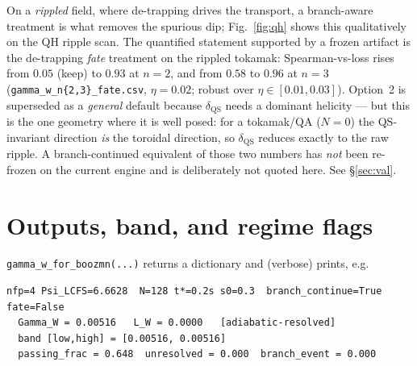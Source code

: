 \documentclass[11pt]{article}
\newcommand{\code}[1]{\texttt{#1}}
\begin{document}
On a \emph{rippled} field, where de-trapping drives the transport, a branch-aware treatment is what
removes the spurious dip; Fig.~\ref{fig:qh} shows this qualitatively on the QH ripple scan. The
quantified statement supported by a frozen artifact is the de-trapping \emph{fate} treatment on the
rippled tokamak: Spearman-vs-loss rises from $0.05$ (keep) to $\mathbf{0.93}$ at $n{=}2$, and from
$0.58$ to $\mathbf{0.96}$ at $n{=}3$ (\code{gamma\_w\_n\{2,3\}\_fate.csv}, $\eta=0.02$; robust over
$\eta\in[0.01,0.03]$). Option~2 is superseded as a \emph{general} default because $\delta_{\mathrm{QS}}$
needs a dominant helicity --- but this is the one geometry where it is well posed: for a tokamak/QA
($N{=}0$) the QS-invariant direction \emph{is} the toroidal direction, so $\delta_{\mathrm{QS}}$
reduces exactly to the raw ripple. A branch-continued equivalent of those two numbers has \emph{not} been
re-frozen on the current engine and is deliberately not quoted here. See \S\ref{sec:val}.

\section{Outputs, band, and regime flags}
\label{sec:outputs}

\code{gamma\_w\_for\_boozmn(...)} returns a dictionary and (verbose) prints, e.g.
\begin{Verbatim}[fontsize=\small,frame=single,rulecolor=\color{gray},samepage=true]
  nfp=4 Psi_LCFS=6.6628  N=128 t*=0.2s s0=0.3  branch_continue=True fate=False
  Gamma_W = 0.00516   L_W = 0.0000   [adiabatic-resolved]
  band [low,high] = [0.00516, 0.00516]
  passing_frac = 0.648  unresolved = 0.000  branch_event = 0.000
\end{Verbatim}
\end{document}
